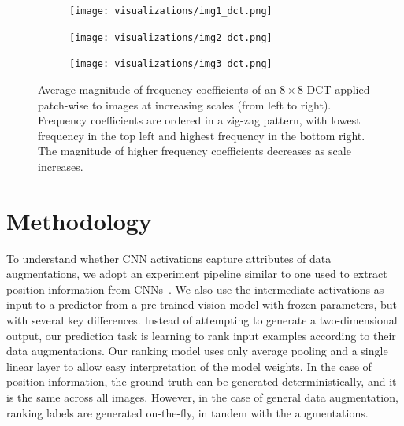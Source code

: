 \begin{figure}
    \begin{subfigure}[b]{0.32\textwidth}
    \centering
    \texttt{[image: visualizations/img1\_dct.png]}
    \caption{}
    \label{fig:my_label}
    \end{subfigure}
    \begin{subfigure}[b]{0.32\textwidth}
    \centering
    \texttt{[image: visualizations/img2\_dct.png]}
    \caption{}
    \label{fig:my_label}
    \end{subfigure}
    \begin{subfigure}[b]{0.32\textwidth}
    \centering
    \texttt{[image: visualizations/img3\_dct.png]}
    \caption{}
    \end{subfigure}
    \caption{Average magnitude of frequency coefficients of an $8 \times 8$ DCT applied patch-wise to images at increasing scales (from left to right). Frequency coefficients are ordered in a zig-zag pattern, with lowest frequency in the top left and highest frequency in the bottom right. The magnitude of higher frequency coefficients decreases as scale increases.}
    \label{fig:dct}
\end{figure}



\section{Methodology}
To understand whether CNN activations capture attributes of data augmentations, we adopt an experiment pipeline similar to one used to extract position information from CNNs~\cite{islam2019much}.
We also use the intermediate activations as input to a predictor from a pre-trained vision model with frozen parameters, but with several key differences.
Instead of attempting to generate a two-dimensional output, our prediction task is learning to rank input examples according to their data augmentations.
Our ranking model uses only average pooling and a single linear layer to allow easy interpretation of the model weights.
In the case of position information, the ground-truth can be generated deterministically, and it is the same across all images.
However, in the case of general data augmentation, ranking labels are generated on-the-fly, in tandem with the augmentations.







